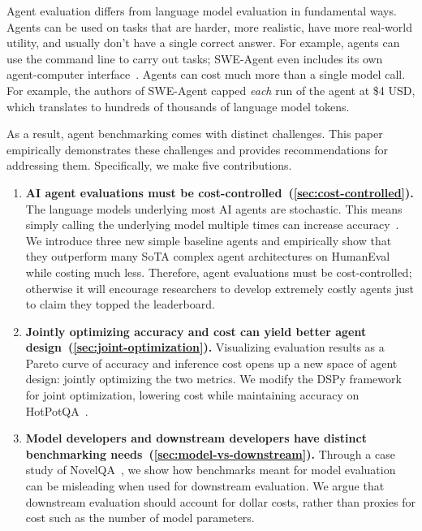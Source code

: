 \documentclass{article}
\begin{document}
Agent evaluation differs from language model evaluation in fundamental ways. Agents can be used on tasks that are harder, more realistic, have more real-world utility, and usually don't have a single correct answer. For example, agents can use the command line to carry out tasks;  SWE-Agent even includes its own agent-computer interface~\citep{yang_swe-agent_2024}. Agents can cost much more than a single model call. For example, the authors of SWE-Agent capped \textit{each} run of the agent at \$4 USD, which translates to hundreds of thousands of language model tokens. 

As a result, agent benchmarking comes with distinct challenges. This paper empirically demonstrates these challenges and provides recommendations for addressing them. Specifically, we make five contributions.
\begin{enumerate}[leftmargin=*]
    \item \textbf{AI agent evaluations must be cost-controlled~(\cref{sec:cost-controlled}).} The language models underlying most AI agents are stochastic. This means simply calling the underlying model multiple times can increase accuracy~\citep{li_competition-level_2022,chen_are_2024, li_more_2024}. 
    We introduce three new simple baseline agents and empirically show that they outperform many SoTA complex agent architectures on HumanEval~\citep{zhong_ldb_2024, zhou_language_2023, shinn_reflexion_2023} while costing much less.
    Therefore, agent evaluations must be cost-controlled; otherwise it will encourage researchers to develop extremely costly agents just to claim they topped the leaderboard. 
    
    \item \textbf{Jointly optimizing accuracy and cost can yield better agent design~(\cref{sec:joint-optimization}).} Visualizing evaluation results as a Pareto curve of accuracy and inference cost opens up a new space of agent design: jointly optimizing the two metrics. We modify the DSPy framework~\citep{khattab_dspy_2023} for joint optimization, lowering cost while maintaining accuracy on HotPotQA~\citep{yang_hotpotqa_2018}.
    
    \item \textbf{Model developers and downstream developers have distinct benchmarking needs~(\cref{sec:model-vs-downstream}).} Through a case study of NovelQA~\citep{wang_novelqa_2024}, we show how benchmarks meant for model evaluation can be misleading when used for downstream evaluation. We argue that downstream evaluation should account for dollar costs, rather than proxies for cost such as the number of model parameters. 
    

\end{enumerate}
\end{document}
